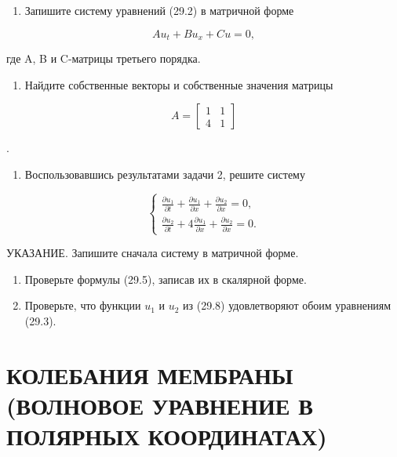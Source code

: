 \documentclass[
  ukrainian,
]{article}
\providecommand{\tightlist}{%
  \setlength{\itemsep}{0pt}\setlength{\parskip}{0pt}}
\begin{document}
\begin{enumerate}
\def\labelenumi{\arabic{enumi}.}
\tightlist
\item
  Запишите систему уравнений (29.2) в матричной форме
\end{enumerate}

\[
Au_t + Bu_x + Cu = 0,
\]

где A, B и C-матрицы третьего порядка.

\begin{enumerate}
\def\labelenumi{\arabic{enumi}.}
\setcounter{enumi}{1}
\tightlist
\item
  Найдите собственные векторы и собственные значения матрицы
\end{enumerate}

\[
A =
\begin{bmatrix} 1 & 1 \\ 4 & 1 \end{bmatrix}
\]

.

\begin{enumerate}
\def\labelenumi{\arabic{enumi}.}
\setcounter{enumi}{2}
\tightlist
\item
  Воспользовавшись результатами задачи 2, решите систему
\end{enumerate}

\[
\begin{cases} \frac{\partial u_1}{\partial t} + \frac{\partial u_1}{\partial x} + \frac{\partial u_2}{\partial x} = 0, \\ \frac{\partial u_2}{\partial t} + 4 \frac{\partial u_1}{\partial x} + \frac{\partial u_2}{\partial x} = 0. \end{cases}
\]

УКАЗАНИЕ. Запишите сначала систему в матричной форме.

\begin{enumerate}
\def\labelenumi{\arabic{enumi}.}
\setcounter{enumi}{3}
\item
  Проверьте формулы (29.5), записав их в скалярной форме.
\item
  Проверьте, что функции \(u_1\) и \(u_2\) из (29.8) удовлетворяют обоим
  уравнениям (29.3).
\end{enumerate}

\section{КОЛЕБАНИЯ МЕМБРАНЫ (ВОЛНОВОЕ УРАВНЕНИЕ В ПОЛЯРНЫХ
КООРДИНАТАХ)}\label{ux43aux43eux43bux435ux431ux430ux43dux438ux44f-ux43cux435ux43cux431ux440ux430ux43dux44b-ux432ux43eux43bux43dux43eux432ux43eux435-ux443ux440ux430ux432ux43dux435ux43dux438ux435-ux432-ux43fux43eux43bux44fux440ux43dux44bux445-ux43aux43eux43eux440ux434ux438ux43dux430ux442ux430ux445}
\end{document}
